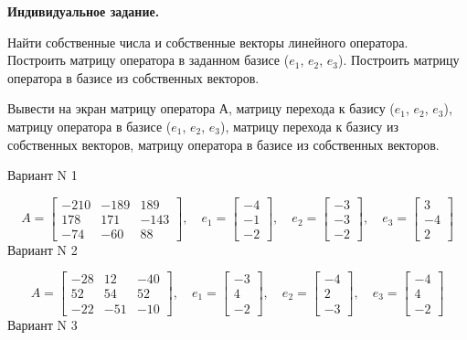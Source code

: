 \documentclass[11pt]{report}
\begin{document}
\pagestyle{empty}

{\bf Индивидуальное задание.}


Найти собственные числа и собственные векторы линейного оператора. 
Построить матрицу оператора в заданном базисе ($e_1$, $e_2$, $e_3$). 
Построить матрицу оператора в базисе из собственных векторов.

Вывести на экран матрицу оператора А, матрицу перехода к базису ($e_1$, $e_2$, $e_3$), 
матрицу оператора в базисе ($e_1$, $e_2$, $e_3$), матрицу перехода к базису из собственных векторов, 
матрицу оператора в базисе из собственных векторов.

Вариант N 1

$$A = \left[\begin{matrix}-210 & -189 & 189\\178 & 171 & -143\\-74 & -60 & 88\end{matrix}\right],\quad e_1 = \left[\begin{matrix}-4\\-1\\-2\end{matrix}\right],\quad e_2 = \left[\begin{matrix}-3\\-3\\-2\end{matrix}\right],\quad e_3 = \left[\begin{matrix}3\\-4\\2\end{matrix}\right]$$Вариант N 2

$$A = \left[\begin{matrix}-28 & 12 & -40\\52 & 54 & 52\\-22 & -51 & -10\end{matrix}\right],\quad e_1 = \left[\begin{matrix}-3\\4\\-2\end{matrix}\right],\quad e_2 = \left[\begin{matrix}-4\\2\\-3\end{matrix}\right],\quad e_3 = \left[\begin{matrix}-4\\4\\-2\end{matrix}\right]$$Вариант N 3
\end{document}
